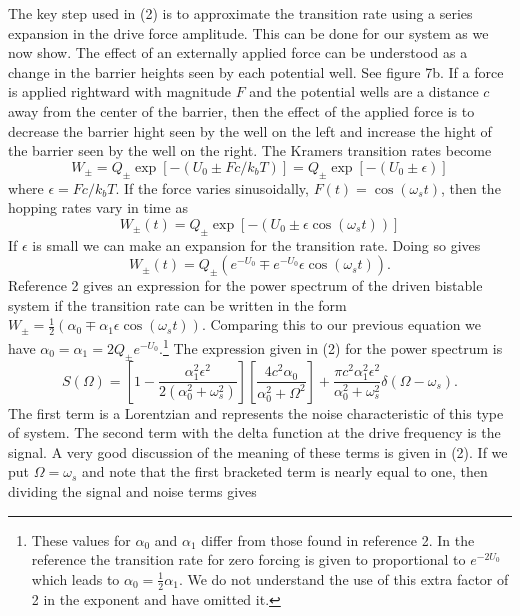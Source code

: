 \documentclass{report}
\begin{document}
The key step used in (2) is to approximate the transition rate using a series expansion in the drive force amplitude. This can be done for our system as we now show. The effect of an externally applied force can be understood as a change in the barrier heights seen by each potential well. See figure 7b. If a force is applied rightward with magnitude $F$ and the potential wells are a distance $c$ away from the center of the barrier, then the effect of the applied force is to decrease the barrier hight seen by the well on the left and increase the hight of the barrier seen by the well on the right. The Kramers transition rates become
\begin{displaymath}
W_{\pm} = Q_{\pm} \exp \left[-(U_0 \pm Fc/k_bT) \right] = Q_{\pm} \exp \left[-(U_0 \pm \epsilon) \right]
\end{displaymath}
where $\epsilon=Fc/k_bT$. If the force varies sinusoidally, $F(t)=\cos(\omega_s t)$, then the hopping rates vary in time as
\begin{displaymath} W_{\pm}(t) = Q_{\pm} \exp \left[-(U_0 \pm \epsilon \cos (\omega_s t)) \right]
\end{displaymath}
If $\epsilon$ is small we can make an expansion for the transition rate. Doing so gives
\begin{displaymath}
W_{\pm}(t) = Q_{\pm} (e^{-U_0} \mp e^{-U_0} \epsilon \cos (\omega_s t)).
\end{displaymath} 
Reference 2 gives an expression for the power spectrum of the driven bistable system if the transition rate can be written in the form $W_{\pm} = \frac{1}{2}(\alpha_0 \mp \alpha_1 \epsilon \cos(\omega_s t))$. Comparing this to our previous equation we have $\alpha_0 = \alpha_1 = 2Q_{\pm}e^{-U_0}$.\footnote{These values for $\alpha_0$ and $\alpha_1$ differ from those found in reference 2. In the reference the transition rate for zero forcing is given to proportional to $e^{-2U_0}$ which leads to $\alpha_0=\frac{1}{2}\alpha_1$. We do not understand the use of this extra factor of 2 in the exponent and have omitted it.} The expression given in (2) for the power spectrum is
\begin{displaymath}
S(\Omega)=\left[ 1-\frac{\alpha_1^2\epsilon^2}{2(\alpha_0^2+\omega_s^2)}\right]\left[\frac{4c^2\alpha_0}{\alpha_0^2+\Omega^2}\right]+\frac{\pi c^2 \alpha_1^2 \epsilon^2}{\alpha_0^2+\omega_s^2}\delta (\Omega-\omega_s).
\end{displaymath}
The first term is a Lorentzian and represents the noise characteristic of this type of system. The second term with the delta function at the drive frequency is the signal. A very good discussion of the meaning of these terms is given in (2). If we put $\Omega = \omega_s$ and note that the first bracketed term is nearly equal to one, then dividing the signal and noise terms gives
\end{document}

